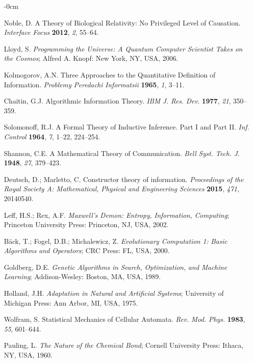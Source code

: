 \documentclass[entropy,article,submit,pdftex,moreauthors]{Definitions/mdpi}
\begin{document}
\begin{adjustwidth}{-\extralength}{0cm}
\begin{thebibliography}{999}
Noble, D. A Theory of Biological Relativity: No Privileged Level of Causation. \textit{Interface Focus} \textbf{2012}, \textit{2}, 55–64.

Lloyd, S. \textit{Programming the Universe: A Quantum Computer Scientist Takes on the Cosmos}; Alfred A. Knopf: New York, NY, USA, 2006.

Kolmogorov, A.N. Three Approaches to the Quantitative Definition of Information. \textit{Problemy Peredachi Informatsii} \textbf{1965}, \textit{1}, 3–11.

Chaitin, G.J. Algorithmic Information Theory. \textit{IBM J. Res. Dev.} \textbf{1977}, \textit{21}, 350–359. 

Solomonoff, R.J. A Formal Theory of Inductive Inference. Part I and Part II. \textit{Inf. Control} \textbf{1964}, \textit{7}, 1–22, 224–254.

Shannon, C.E. A Mathematical Theory of Communication. \textit{Bell Syst. Tech. J.} \textbf{1948}, \textit{27}, 379–423.

Deutsch, D.; Marletto, C. Constructor theory of information. \textit{Proceedings of the Royal Society A: Mathematical, Physical and Engineering Sciences} \textbf{2015}, \textit{471}, 20140540. 

Leff, H.S.; Rex, A.F. \textit{Maxwell’s Demon: Entropy, Information, Computing}; Princeton University Press: Princeton, NJ, USA, 2002.

Bäck, T.; Fogel, D.B.; Michalewicz, Z. \textit{Evolutionary Computation 1: Basic Algorithms and Operators}; CRC Press: FL, USA, 2000.

Goldberg, D.E. \textit{Genetic Algorithms in Search, Optimization, and Machine Learning}; Addison-Wesley: Boston, MA, USA, 1989.

Holland, J.H. \textit{Adaptation in Natural and Artificial Systems}; University of Michigan Press: Ann Arbor, MI, USA, 1975.

Wolfram, S. Statistical Mechanics of Cellular Automata. \textit{Rev. Mod. Phys.} \textbf{1983}, \textit{55}, 601–644.

Pauling, L. \textit{The Nature of the Chemical Bond}; Cornell University Press: Ithaca, NY, USA, 1960.


\end{thebibliography}
\end{adjustwidth}
\end{document}

